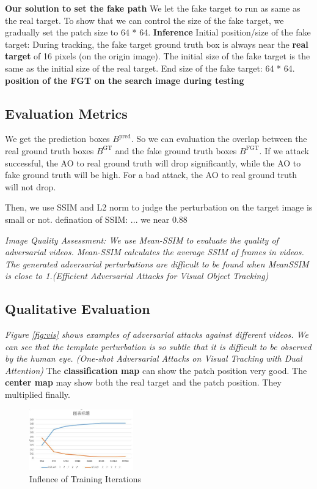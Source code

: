 \documentclass{article}
\begin{document}
\textbf{Our solution to set the fake path} We let the fake target to run as same as the real target. To show that we can control the size of the fake target, we gradually set the patch size to 64 * 64.
\textbf{Inference} 
Initial position/size of the fake target: During tracking, the fake target ground truth box is always near the \textbf{real target} of 16 pixels (on the origin image).
The initial size of the fake target is the same as the initial size of the real target.
End size of the fake target: 64 * 64.
\textbf {position of the FGT on the search image during testing}

\subsection{Evaluation Metrics}

We get the prediction boxes $B^{\text{pred}}$. So we can evaluation the overlap between the real ground truth boxes $B^{\text{GT}}$ and the fake ground truth boxes $B^{\text{FGT}}$. If we attack successful, the AO to real ground truth will drop significantly, while the AO to fake ground truth will be high. For a bad attack, the AO to real ground truth will not drop. 

Then, we use SSIM and L2 norm to judge the perturbation on the target image is small or not. 
defination of SSIM: ... we near 0.88

\textit{Image Quality Assessment: We use Mean-SSIM to evaluate the quality of adversarial videos. Mean-SSIM calculates the average SSIM of frames in videos. The generated adversarial perturbations are difficult to be found when MeanSSIM is close to 1.(Efficient Adversarial Attacks for Visual Object Tracking)}

\subsection{Qualitative Evaluation}

\textit{Figure \ref{fig:vis} shows examples of adversarial attacks against different videos. We can see that the template perturbation is so subtle that it is difficult to be observed by the human eye. (One-shot Adversarial Attacks on Visual Tracking with Dual Attention)} The \textbf{classification map} can show the patch position very good. The \textbf{center map} may show both the real target and the patch position. They multiplied finally.

\begin{figure}[ht]
\centering
\includegraphics[width=0.4\textwidth]{images/iter.jpg}
\caption{Inflence of Training Iterations}
\end{figure}
\end{document}
